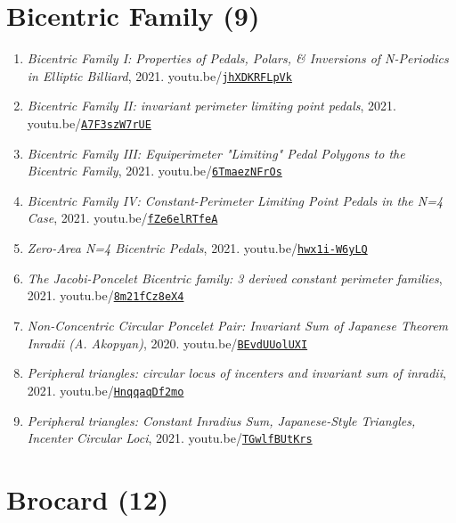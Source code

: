 \documentclass[12pt]{article}
\begin{document}
\section{Bicentric Family (9)}

\begin{enumerate}[resume]
\item \textit{Bicentric Family I: Properties of Pedals, Polars, \& Inversions of N-Periodics in Elliptic Billiard}, 2021. youtu.be/\href{https://youtu.be/jhXDKRFLpVk}{\nolinkurl{jhXDKRFLpVk}}
\item \textit{Bicentric Family II: invariant perimeter limiting point pedals}, 2021. youtu.be/\href{https://youtu.be/A7F3szW7rUE}{\nolinkurl{A7F3szW7rUE}}
\item \textit{Bicentric Family III: Equiperimeter "Limiting" Pedal Polygons to the Bicentric Family}, 2021. youtu.be/\href{https://youtu.be/6TmaezNFrOs}{\nolinkurl{6TmaezNFrOs}}
\item \textit{Bicentric Family IV: Constant-Perimeter Limiting Point Pedals in the N=4 Case}, 2021. youtu.be/\href{https://youtu.be/fZe6elRTfeA}{\nolinkurl{fZe6elRTfeA}}
\item \textit{Zero-Area N=4 Bicentric Pedals}, 2021. youtu.be/\href{https://youtu.be/hwx1i-W6yLQ}{\nolinkurl{hwx1i-W6yLQ}}
\item \textit{The Jacobi-Poncelet Bicentric family: 3 derived constant perimeter families}, 2021. youtu.be/\href{https://youtu.be/8m21fCz8eX4}{\nolinkurl{8m21fCz8eX4}}
\item \textit{Non-Concentric Circular Poncelet Pair: Invariant Sum of Japanese Theorem Inradii (A. Akopyan)}, 2020. youtu.be/\href{https://youtu.be/BEvdUUolUXI}{\nolinkurl{BEvdUUolUXI}}
\item \textit{Peripheral triangles: circular locus of incenters and invariant sum of inradii}, 2021. youtu.be/\href{https://youtu.be/HnqqaqDf2mo}{\nolinkurl{HnqqaqDf2mo}}
\item \textit{Peripheral triangles: Constant Inradius Sum, Japanese-Style Triangles, Incenter Circular Loci}, 2021. youtu.be/\href{https://youtu.be/TGwlfBUtKrs}{\nolinkurl{TGwlfBUtKrs}}
\end{enumerate}

\section{Brocard (12)}
\end{document}
